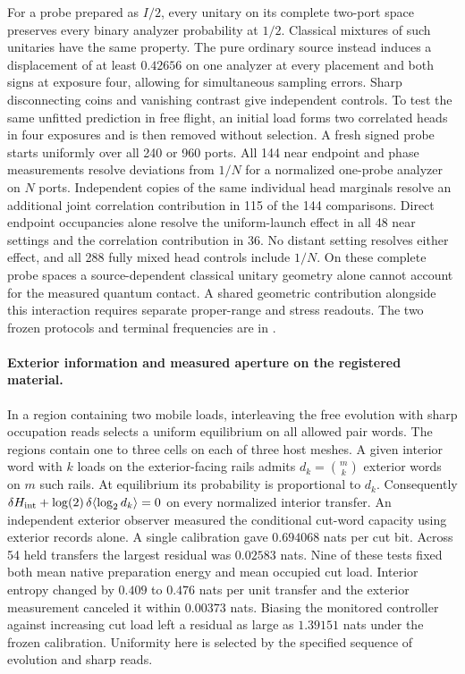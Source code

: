 \documentclass[11pt]{article}
\begin{document}
For a probe prepared as $I/2$, every unitary on its complete two-port
space preserves every binary analyzer probability at $1/2$. Classical
mixtures of such unitaries have the same property. The pure ordinary
source instead induces a displacement of at least $0.42656$ on one
analyzer at every placement and both signs at exposure four, allowing for
simultaneous sampling errors. Sharp disconnecting coins and vanishing
contrast give independent controls. To test the same unfitted prediction
in free flight, an initial load forms two correlated heads in four
exposures and is then removed without selection. A fresh signed probe
starts uniformly over all 240 or 960 ports. All 144 near endpoint and
phase measurements resolve deviations from $1/N$ for a normalized
one-probe analyzer on $N$ ports. Independent copies of the same individual
head marginals resolve an additional joint correlation contribution in
115 of the 144 comparisons. Direct endpoint occupancies alone resolve
the uniform-launch effect in all 48 near settings and the correlation
contribution in 36. No distant setting resolves either effect,
and all 288 fully mixed head controls include $1/N$. On these complete
probe spaces a source-dependent classical unitary geometry alone cannot
account for the measured quantum contact. A shared geometric contribution
alongside this interaction requires separate proper-range and stress
readouts. The two frozen protocols and terminal frequencies are in
.

\paragraph{Exterior information and measured aperture on the registered material.}
In a region containing two mobile loads, interleaving the free evolution
with sharp occupation reads selects a uniform equilibrium on all allowed
pair words. The regions contain one to three cells on each of three
host meshes. A given interior word with $k$ loads on the exterior-facing
rails admits $d_k=\binom{m}{k}$ exterior words on $m$ such rails. At
equilibrium its probability is proportional to $d_k$. Consequently
$\delta H_{\rm int}+\log(2)\,\delta\langle\log_2 d_k\rangle=0$ on every
normalized interior transfer. An independent exterior observer measured
the conditional cut-word capacity using exterior records alone. A single
calibration gave $0.694068$ nats per cut bit. Across 54 held transfers
the largest residual was $0.02583$ nats. Nine of these tests fixed both
mean native preparation energy and mean occupied cut load. Interior
entropy changed by $0.409$ to $0.476$ nats per unit transfer and the
exterior measurement canceled it within $0.00373$ nats. Biasing the
monitored controller against increasing cut load left a residual as
large as $1.39151$ nats under the frozen calibration. Uniformity here is
selected by the specified sequence of evolution and sharp reads.
\end{document}
